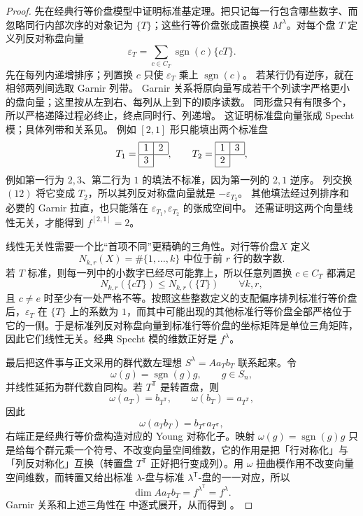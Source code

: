 \begin{proof}
先在经典行等价盘模型中证明标准基定理。把只记每一行包含哪些数字、而忽略同行内部次序的对象记为 $\{T\}$；这些行等价盘张成置换模 $M^\lambda$。对每个盘 $T$ 定义列反对称盘向量
\[
\varepsilon_T
=\sum_{c\in C_T}\operatorname{sgn}(c)\{cT\}.
\]
先在每列内递增排序；列置换 $c$ 只使 $\varepsilon_T$ 乘上 $\operatorname{sgn}(c)$。
若某行仍有逆序，就在相邻两列间选取 Garnir 列带。
Garnir 关系将原向量写成若干个列读字严格更小的盘向量；这里按从左到右、每列从上到下的顺序读数。
同形盘只有有限多个，所以严格递降过程必终止，终点同时行、列递增。
这证明标准盘向量张成 Specht 模；具体列带和关系见。
例如 $[2,1]$ 形只能填出两个标准盘
\[
T_1=\begin{array}{|c|c|}\hline 1&2\\ \hline 3\\ \cline{1-1}\end{array},
\qquad
T_2=\begin{array}{|c|c|}\hline 1&3\\ \hline 2\\ \cline{1-1}\end{array},
\]
例如第一行为 $2,3$、第二行为 $1$ 的填法不标准，因为第一列的 $2,1$ 逆序。
列交换 $(12)$ 将它变成 $T_2$，所以其列反对称盘向量就是 $-\varepsilon_{T_2}$。
其他填法经过列排序和必要的 Garnir 拉直，也只能落在 $\varepsilon_{T_1},\varepsilon_{T_2}$ 的张成空间中。
还需证明这两个向量线性无关，才能得到 $f^{[2,1]}=2$。

线性无关性需要一个比“首项不同”更精确的三角性。对行等价盘$X$ 定义
\[
N_{k,r}(X)
=\#\{1,\dots,k\}\text{ 中位于前 }r\text{ 行的数字数}.
\]
若 $T$ 标准，则每一列中的小数字已经尽可能靠上，所以任意列置换 $c\in C_T$ 都满足
\[
N_{k,r}(\{cT\})\le N_{k,r}(\{T\})
\qquad \forall k,r,
\]
且 $c\neq e$ 时至少有一处严格不等。按照这些整数定义的支配偏序排列标准行等价盘后，$\varepsilon_T$ 在 $\{T\}$ 上的系数为 $1$，而其中可能出现的其他标准行等价盘全部严格位于它的一侧。于是标准列反对称盘向量到标准行等价盘的坐标矩阵是单位三角矩阵，因此它们线性无关。经典 Specht 模的维数正好是 $f^\lambda$。

最后把这件事与正文采用的群代数左理想 $S^\lambda=Aa_Tb_T$ 联系起来。令
\[
\omega(g)=\operatorname{sgn}(g)g,
\qquad g\in S_n,
\]
并线性延拓为群代数自同构。若 $T^{\mathsf T}$ 是转置盘，则
\[
\omega(a_T)=b_{T^{\mathsf T}},
\qquad
\omega(b_T)=a_{T^{\mathsf T}},
\]
因此
\[
\omega(a_Tb_T)=b_{T^{\mathsf T}}a_{T^{\mathsf T}},
\]
右端正是经典行等价盘构造对应的 Young 对称化子。映射 $\omega(g)=\operatorname{sgn}(g)g$ 只是给每个群元乘一个符号、不改变向量空间维数，它的作用是把「行对称化」与「列反对称化」互换（转置盘 $T^{\mathsf T}$ 正好把行变成列）。用 $\omega$ 扭曲模作用不改变向量空间维数，而转置又给出标准 $\lambda$-盘与标准 $\lambda^{\mathsf T}$-盘的一一对应，所以
\[
\dim Aa_Tb_T=f^{\lambda^{\mathsf T}}=f^\lambda.
\]
Garnir 关系和上述三角性在 中逐式展开，从而得到 。
\end{proof}


